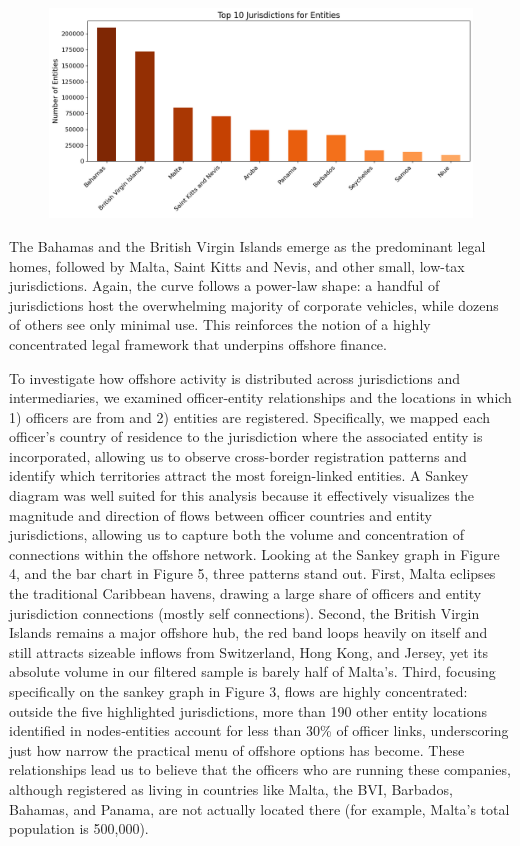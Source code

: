 \documentclass{article}
\begin{document}
\begin{figure}[H]
  \centering
  \caption{} 
  \label{fig:fig3}
  \includegraphics[width=\textwidth]{Figure 3.png}
\end{figure}


The Bahamas and the British Virgin Islands emerge as the predominant legal homes, followed by Malta, Saint Kitts and Nevis, and other small, low-tax jurisdictions. Again, the curve follows a power-law shape: a handful of jurisdictions host the overwhelming majority of corporate vehicles, while dozens of others see only minimal use. This reinforces the notion of a highly concentrated legal framework that underpins offshore finance.

To investigate how offshore activity is distributed across jurisdictions and intermediaries, we examined officer-entity relationships and the locations in which 1) officers are from and 2) entities are registered. Specifically, we mapped each officer’s country of residence to the jurisdiction where the associated entity is incorporated, allowing us to observe cross-border registration patterns and identify which territories attract the most foreign-linked entities. A Sankey diagram was well suited for this analysis because it effectively visualizes the magnitude and direction of flows between officer countries and entity jurisdictions, allowing us to capture both the volume and concentration of connections within the offshore network. Looking at the Sankey graph in Figure 4, and the bar chart in Figure 5, three patterns stand out. First, Malta eclipses the traditional Caribbean havens, drawing a large share of officers and entity jurisdiction connections (mostly self connections). Second, the British Virgin Islands remains a major offshore hub, the red band loops heavily on itself and still attracts sizeable inflows from Switzerland, Hong Kong, and Jersey, yet its absolute volume in our filtered sample is barely half of Malta’s. Third, focusing specifically on the sankey graph in Figure 3, flows are highly concentrated: outside the five highlighted jurisdictions, more than 190 other entity locations identified in nodes‑entities account for less than 30\% of officer links, underscoring just how narrow the practical menu of offshore options has become. These relationships lead us to believe that the officers who are running these companies, although registered as living in countries like Malta, the BVI, Barbados, Bahamas, and Panama, are not actually located there (for example, Malta’s total population is 500,000). 
\end{document}
